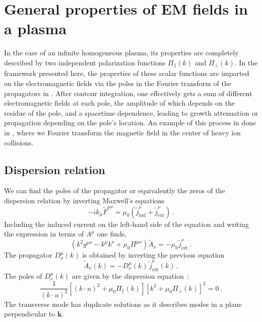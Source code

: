 \section{General properties of EM fields in a plasma}
In the case of an infinite homogeneous plasma, its properties are completely described by two independent polarization functions $\Pi_\parallel(k)$ and $\Pi_\perp(k)$. In the framework presented here, the properties of these scalar functions are imparted on the electromagnetic fields via the poles in the Fourier transform of the propagators in . After contour integration, one effectively gets a sum of different electromagnetic fields at each pole, the amplitude of which depends on the residue of the pole, and a spacetime dependence, leading to growth attenuation or propagation depending on the pole's location. An example of this process in done in \cite{Grayson:2022asf}, where we Fourier transform the magnetic field in the center of heavy ion collisions. 

\subsection{Dispersion relation}
We can find the poles of the propagator or equivalently the zeros of the dispersion relation by inverting Maxwell's equations
\begin{equation}
    -ik_{\mu}\widetilde{F}^{\mu \nu} = \mu_0( \widetilde{j}_{\mathrm{ind}}^{\nu}+\widetilde{j}_{\mathrm{ext}}^{\nu})\,.
\end{equation}
Including the induced current on the left-hand side of the equation and writing the expression in terms of $A^{\mu}$ one finds,
\begin{equation}
    (k^2g^{\mu \nu} - k^{\mu} k^{\nu} + \mu_0\Pi^{\mu \nu})\widetilde{A}_{\nu} = - \mu_0\widetilde{j}_{\mathrm{ext}}^{\nu} \,.
\end{equation}
The propagator $D^\mu_\nu(k)$ is obtained by inverting the previous equation
\begin{equation}
    \widetilde{A}_{\nu}(k) = -D^{\mu}_{\nu}(k) \,\widetilde{j}_{\mathrm{ext}}^{\nu}(k) \,.
\end{equation}
The poles of $D^\mu_\nu(k)$ are given by the dispersion equation~\cite{melrose2008quantum}:
\begin{equation}\label{eq:disp}
 \frac{1}{(k\cdot u)^2}\left[(k\cdot u)^2+ \mu_0\Pi_\parallel(k)\right]\left[k^2 + \mu_0 \Pi_\perp(k)\right]^2=0 \,.
\end{equation}
The transverse mode has duplicate solutions as it describes modes in a plane perpendicular to $\boldsymbol{k}$.

